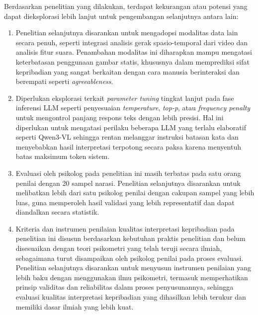 Berdasarkan penelitian yang dilakukan, terdapat kekurangan atau potensi yang dapat dieksplorasi lebih lanjut untuk pengembangan selanjutnya antara lain:

\begin{enumerate}[nosep]

  \item Penelitian selanjutnya disarankan untuk mengadopsi modalitas data lain secara penuh, seperti integrasi analisis gerak spasio-temporal dari video dan analisis fitur suara. Penambahan modalitas ini diharapkan mampu mengatasi keterbatasan penggunaan gambar statis, khususnya dalam memprediksi sifat kepribadian yang sangat berkaitan dengan cara manusia berinteraksi dan berempati seperti \textit{agreeableness}.

  \item Diperlukan eksplorasi terkait \textit{parameter tuning} tingkat lanjut pada fase inferensi LLM seperti penyesuaian \textit{temperature}, \textit{top-p}, atau \textit{frequency penalty} untuk mengontrol panjang respons teks dengan lebih presisi. Hal ini diperlukan untuk mengatasi perilaku beberapa LLM yang terlalu elaboratif seperti Qwen3-VL sehingga rentan melanggar instruksi batasan kata dan menyebabkan hasil interpretasi terpotong secara paksa karena menyentuh batas maksimum token sistem.

  \item Evaluasi oleh psikolog pada penelitian ini masih terbatas pada satu orang penilai dengan 20 sampel narasi. Penelitian selanjutnya disarankan untuk melibatkan lebih dari satu psikolog penilai dengan cakupan sampel yang lebih luas, guna memperoleh hasil validasi yang lebih representatif dan dapat diandalkan secara statistik.
  
  \item Kriteria dan instrumen penilaian kualitas interpretasi kepribadian pada penelitian ini disusun berdasarkan kebutuhan praktis penelitian dan belum disesuaikan dengan teori psikometri yang telah teruji secara ilmiah, sebagaimana turut disampaikan oleh psikolog penilai pada proses evaluasi. Penelitian selanjutnya disarankan untuk menyusun instrumen penilaian yang lebih baku dengan menggunakan ilmu psikometri, termasuk memperhatikan prinsip validitas dan reliabilitas dalam proses penyusunannya, sehingga evaluasi kualitas interpretasi kepribadian yang dihasilkan lebih terukur dan memiliki dasar ilmiah yang lebih kuat.

\end{enumerate}
